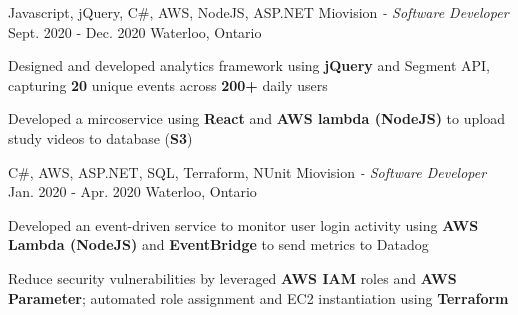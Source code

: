 \begin{siderules}
  \begin{cventries}
    \cventry
    {Javascript, jQuery, C\#, AWS, NodeJS, ASP.NET}
    {Miovision\hspace{0.15em} \bodyfontlight\itshape{- Software Developer}}
    {Sept. 2020 - Dec. 2020}
    {Waterloo, Ontario}
    {
      \begin{cvitems}
        \item {Designed and developed analytics framework using \textbf{jQuery} and Segment API, capturing \textbf{20} unique events across \textbf{200+} daily users}
        \item {Developed a mircoservice using \textbf{React} and \textbf{AWS lambda (NodeJS)} to upload study videos to database (\textbf{S3})}
      \end{cvitems}
    }
    \cventry
    {C\#, AWS, ASP.NET, SQL, Terraform, NUnit}
    {Miovision\hspace{0.15em} \bodyfontlight\itshape{- Software Developer}}
    {Jan. 2020 - Apr. 2020}
    {Waterloo, Ontario}
    {
      \begin{cvitems}
        \item {Developed an event-driven service to monitor user login activity using \textbf{AWS Lambda (NodeJS)} and \textbf{EventBridge} to send metrics to Datadog}
        \item {Reduce security vulnerabilities by leveraged \textbf{AWS IAM} roles and \textbf{AWS Parameter}; automated role assignment and EC2 instantiation using \textbf{Terraform}}

\end{cvitems}}
\end{cventries}
\end{siderules}
